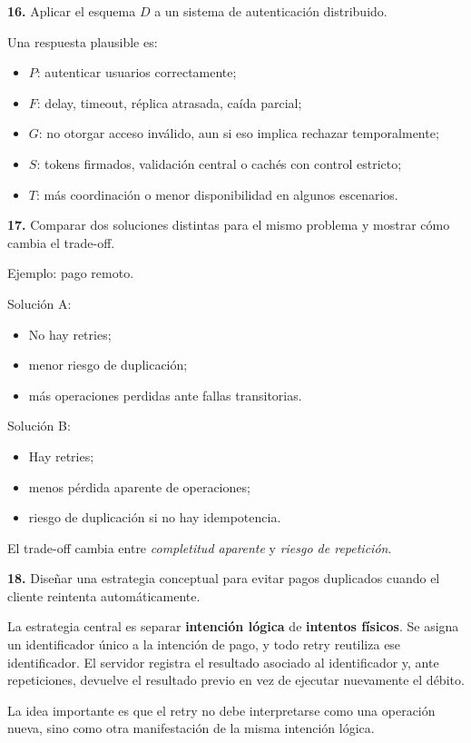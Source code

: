 \documentclass[variant=guia,cover=institutional,mode=screen]{ua-engineering-v6-article}
\begin{document}
\begin{uaexercise}
\textbf{16.}
Aplicar el esquema $D$ a un sistema de autenticación distribuido.
\end{uaexercise}
\begin{uaanswer}
Una respuesta plausible es:

\begin{itemize}
\item $P$: autenticar usuarios correctamente;
\item $F$: delay, timeout, réplica atrasada, caída parcial;
\item $G$: no otorgar acceso inválido, aun si eso implica rechazar temporalmente;
\item $S$: tokens firmados, validación central o cachés con control estricto;
\item $T$: más coordinación o menor disponibilidad en algunos escenarios.
\end{itemize}
\end{uaanswer}

\begin{uaexercise}
\textbf{17.}
Comparar dos soluciones distintas para el mismo problema y mostrar cómo cambia el trade-off.
\end{uaexercise}
\begin{uaanswer}
Ejemplo: pago remoto.

Solución A:
\begin{itemize}
\item No hay retries;
\item menor riesgo de duplicación;
\item más operaciones perdidas ante fallas transitorias.
\end{itemize}

Solución B:
\begin{itemize}
\item Hay retries;
\item menos pérdida aparente de operaciones;
\item riesgo de duplicación si no hay idempotencia.
\end{itemize}

El trade-off cambia entre \emph{completitud aparente} y \emph{riesgo de repetición}.
\end{uaanswer}

\begin{uaexercise}
\textbf{18.}
Diseñar una estrategia conceptual para evitar pagos duplicados cuando el cliente reintenta automáticamente.
\end{uaexercise}
\begin{uaanswer}
La estrategia central es separar \textbf{intención lógica} de \textbf{intentos físicos}.
Se asigna un identificador único a la intención de pago, y todo retry reutiliza ese identificador.
El servidor registra el resultado asociado al identificador y, ante repeticiones, devuelve el resultado previo en vez de ejecutar nuevamente el débito.

La idea importante es que el retry no debe interpretarse como una operación nueva, sino como otra manifestación de la misma intención lógica.
\end{uaanswer}
\end{document}
